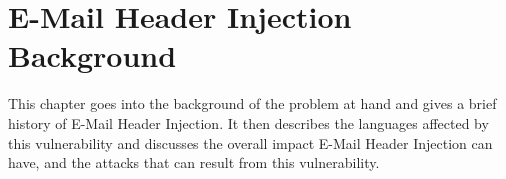 \chapter{E-Mail Header Injection Background}
This chapter goes into the background of the problem at hand and gives a brief history of E-Mail Header Injection. It then describes the languages affected by this vulnerability and discusses the overall impact E-Mail Header Injection can have, and the attacks that can result from this vulnerability.




